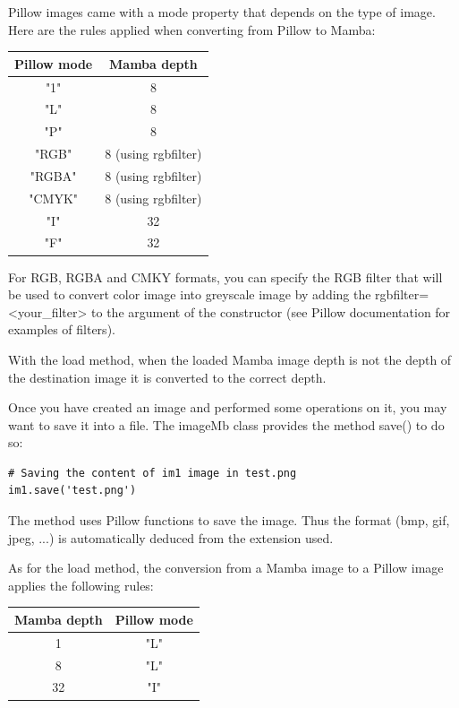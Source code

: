\documentclass[a4paper,10pt,oneside]{article}
\begin{document}
Pillow images came with a mode property that depends on the type of image.
Here are the rules applied when converting from Pillow to Mamba:

\begin{center}
\begin{tabular}{|c|c|}
  \hline
  Pillow mode & Mamba depth \\
  \hline
  "1" & 8\\
  "L" & 8\\
  "P" & 8\\
  "RGB" & 8 (using rgbfilter)\\
  "RGBA" & 8 (using rgbfilter)\\
  "CMYK" & 8 (using rgbfilter)\\
  "I" & 32\\ 
  "F" & 32\\
  \hline
\end{tabular}
\end{center}

For RGB, RGBA and CMKY formats, you can specify the RGB filter that will be
used to convert color image into greyscale image by adding the
rgbfilter=<your\_filter> to the argument of the constructor (see Pillow
documentation for examples of filters).

With the load method, when the loaded Mamba image depth is not the depth
of the destination image it is converted to the correct depth.

Once you have created an image and performed some operations on it, you may want 
to save it into a file. The imageMb class provides the method save() to do so:

\lstset{language=Python}
\begin{lstlisting}
# Saving the content of im1 image in test.png
im1.save('test.png')
\end{lstlisting}

The method uses Pillow functions to save the image. Thus the format (bmp, gif, 
jpeg, ...) is automatically deduced from the extension used.

As for the load method, the conversion from a Mamba image to a Pillow image
applies the following rules:

\begin{center}
\begin{tabular}{|c|c|}
  \hline
  Mamba depth & Pillow mode \\
  \hline
  1 & "L"\\
  8 & "L"\\
  32 & "I"\\
  \hline
\end{tabular}
\end{center}
\end{document}
